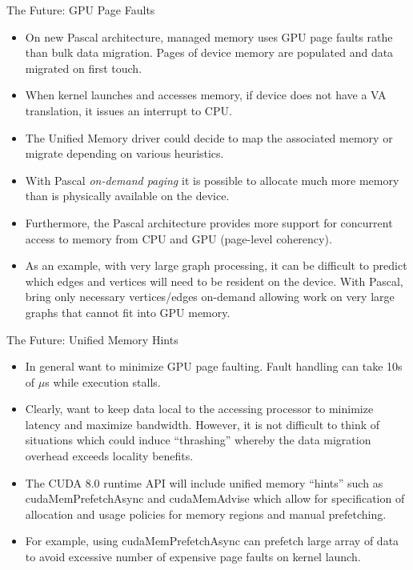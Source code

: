\documentclass{beamer}
\begin{document}
\begin{frame}[fragile]{The Future: GPU Page Faults}
\begin{itemize}
	\item<1->On new Pascal architecture, managed memory uses GPU page faults rathe than bulk data migration.  Pages of device memory are populated and data migrated on first touch.
	\item<1->When kernel launches and accesses memory, if device does not have a VA translation, it issues an interrupt to CPU.
	\item<1->The Unified Memory driver could decide to map the associated memory or migrate depending on various heuristics.
	\item<1->With Pascal \emph{on-demand paging} it is possible to allocate much more memory than is physically available on the device.
	\item<1->Furthermore, the Pascal architecture provides more support for concurrent access to memory from CPU and GPU (page-level coherency).  
	\item<1->As an example, with very large graph processing, it can be difficult to predict which edges and vertices will need to be resident on the device.   With Pascal, bring only necessary vertices/edges on-demand allowing work on very large graphs that cannot fit into GPU memory.
\end{itemize}
\end{frame}

\begin{frame}[fragile]{The Future: Unified Memory Hints}
\begin{itemize}
	\item<1->In general want to minimize GPU page faulting. Fault handling can take 10s of $\mu$s while execution stalls.
	\item<1->Clearly, want to keep data local to the accessing processor to minimize latency and maximize bandwidth.  However, it is not difficult to think of situations which could induce ``thrashing'' whereby the data migration overhead exceeds locality benefits.
	\item<1->The CUDA 8.0 runtime API will include unified memory ``hints'' such as {\selectfont cudaMemPrefetchAsync} and {\selectfont cudaMemAdvise} which allow for specification of allocation and usage policies for memory regions and manual prefetching.
	\item<1->For example, using {\selectfont cudaMemPrefetchAsync} can prefetch large array of data to avoid excessive number of expensive page faults on kernel launch.
	\end{itemize}
\end{frame}
\end{document}
